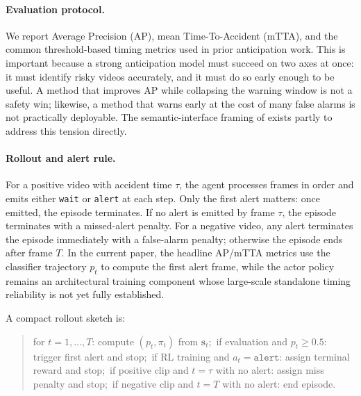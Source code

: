 \paragraph{Evaluation protocol.}
We report Average Precision (AP), mean Time-To-Accident (mTTA), and the common
threshold-based timing metrics used in prior anticipation work. This is
important because a strong anticipation model must succeed on two axes at once:
it must identify risky videos accurately, and it must do so early enough to be
useful. A method that improves AP while collapsing the warning window is not a
safety win; likewise, a method that warns early at the cost of many false
alarms is not practically deployable. The semantic-interface framing of
\method{} exists partly to address this tension directly.

\paragraph{Rollout and alert rule.}
For a positive video with accident time $\tau$, the agent processes frames in
order and emits either \texttt{wait} or \texttt{alert} at each step. Only the
first alert matters: once emitted, the episode terminates. If no alert is
emitted by frame $\tau$, the episode terminates with a missed-alert penalty.
For a negative video, any alert terminates the episode immediately with a
false-alarm penalty; otherwise the episode ends after frame $T$. In the current
paper, the headline AP/mTTA metrics use the classifier trajectory $p_t$ to
compute the first alert frame, while the actor policy remains an architectural
training component whose large-scale standalone timing reliability is not yet
fully established.

A compact rollout sketch is:
\begin{quote}
\small
for $t=1,\dots,T$: compute $(p_t, \pi_t)$ from $\mathbf{s}_t$;\
if evaluation and $p_t \ge 0.5$: trigger first alert and stop;\
if RL training and $a_t{=}\texttt{alert}$: assign terminal reward and stop;\
if positive clip and $t{=}\tau$ with no alert: assign miss penalty and stop;\
if negative clip and $t{=}T$ with no alert: end episode.\
\normalsize
\end{quote}

